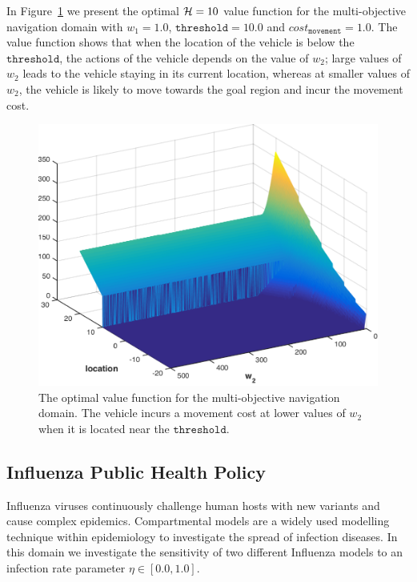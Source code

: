In Figure~\ref{fig:vehicle1d} we present the optimal {\footnotesize$ \mathcal{H} = 10 $} value function for the multi-objective navigation domain with {\footnotesize $w_1 = 1.0$}, {\footnotesize $ \mathtt{threshold} = 10.0 $} and {\footnotesize$ cost_{\mathtt{movement}} = 1.0 $}. The value function shows that when the location of the vehicle is below the {\footnotesize $ \mathtt{threshold} $}, the actions of the vehicle depends on the value of {\footnotesize $ w_2 $}; large values of {\footnotesize $ w_2 $} leads to the vehicle staying in its current location, whereas at smaller values of {\footnotesize $ w_2 $}, the vehicle is likely to move towards the goal region and incur the movement cost.
\begin{figure}[h!]
    \centering
    \includegraphics[width=0.8\linewidth, height=0.55\linewidth]{images/robot1d}
    \caption{The optimal value function for the multi-objective navigation domain. The vehicle incurs a movement cost at lower values of {\footnotesize $w_2$} when it is located near the {\footnotesize $ \mathtt{threshold} $}.}
    \label{fig:vehicle1d}            
\end{figure}

\subsection{Influenza Public Health Policy}
\label{sec:results_influenza}

Influenza viruses continuously challenge human hosts with new variants and cause complex epidemics. Compartmental models are a widely used modelling technique within epidemiology to investigate the spread of infection diseases. In this domain we investigate the sensitivity of two different Influenza models to an infection rate parameter {\footnotesize $ \eta \in [0.0, 1.0]$}. 

